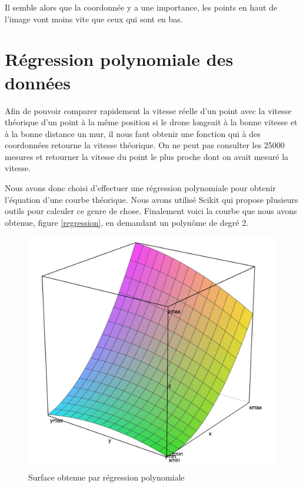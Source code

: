 \documentclass[titlepage,11pt,a4paper]{article}
\begin{document}
Il semble alors que la coordonnée y a une importance, les points en haut de l'image vont moins vite que ceux qui sont en bas.

\section{Régression polynomiale des données}
Afin de pouvoir comparer rapidement la vitesse réelle d'un point avec la vitesse théorique d'un point à la même position si le drone longeait à la bonne vitesse et à la bonne distance un mur, il nous faut obtenir une fonction qui à des coordonnées retourne la vitesse théorique. On ne peut pas consulter les \num{25000} mesures et retourner la vitesse du point le plus proche dont on avait mesuré la vitesse.

Nous avons donc choisi d'effectuer une régression polynomiale pour obtenir l'équation d'une courbe \og{}théorique\fg{}. Nous avons utilisé Scikit qui propose plusieurs outils pour calculer ce genre de chose. Finalement voici la courbe que nous avons obtenue, figure \vref{regression}, en demandant un polynôme de degré 2.

\begin{figure}
	\caption{\label{regression} Surface obtenue par régression polynomiale}
	\includegraphics[scale=0.8]{images/surface-regression.png}
\end{figure}
\end{document}
